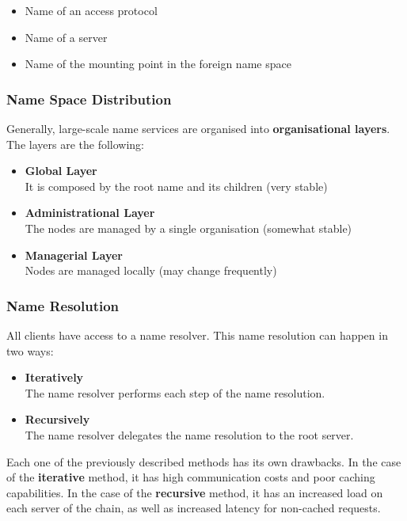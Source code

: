 \documentclass{article}
\begin{document}
\begin{itemize}
	\item Name of an access protocol
	\item Name of a server
	\item Name of the mounting point in the foreign name space
\end{itemize}

\subsubsection{Name Space Distribution}
Generally, large-scale name services are organised into \textbf{organisational layers}. The layers are the following:

\begin{itemize}
	\item \textbf{Global Layer} \\
	It is composed by the root name and its children (very stable)
	
	\item \textbf{Administrational Layer} \\
	The nodes are managed by a single organisation (somewhat stable)
	
	\item \textbf{Managerial Layer} \\
	Nodes are managed locally (may change frequently)
\end{itemize}

\subsubsection{Name Resolution}
All clients have access to a name resolver. This name resolution can happen in two ways:

\begin{itemize}
	\item \textbf{Iteratively} \\
	The name resolver performs each step of the name resolution.
	
	\item \textbf{Recursively} \\
	The name resolver delegates the name resolution to the root server.  
\end{itemize}

\noindent Each one of the previously described methods has its own drawbacks. In the case of the \textbf{iterative} method, it has high communication costs and poor caching capabilities. In the case of the \textbf{recursive} method, it has an increased load on each server of the chain, as well as increased latency for non-cached requests.
\end{document}
